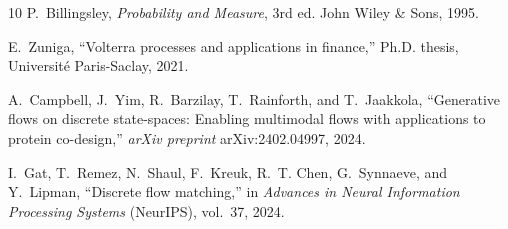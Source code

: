 \documentclass[12pt]{amsart}
\renewcommand{\(}{\left (}
\renewcommand{\)}{\right )}
\numberwithin{equation}{section}
\begin{document}
\begin{thebibliography}{10}
P.~Billingsley,
\emph{Probability and Measure}, 3rd ed.
John Wiley \& Sons, 1995.

E.~Zuniga,
``Volterra processes and applications in finance,''
Ph.D. thesis, Universit\'{e} Paris-Saclay, 2021.

A.~Campbell, J.~Yim, R.~Barzilay, T.~Rainforth, and T.~Jaakkola,
``Generative flows on discrete state-spaces: Enabling multimodal flows with applications to protein co-design,''
\emph{arXiv preprint} arXiv:2402.04997, 2024.

I.~Gat, T.~Remez, N.~Shaul, F.~Kreuk, R.~T. Chen, G.~Synnaeve, and Y.~Lipman,
``Discrete flow matching,''
in \emph{Advances in Neural Information Processing Systems} (NeurIPS), vol.~37, 2024.

 

\end{thebibliography}
\end{document}
